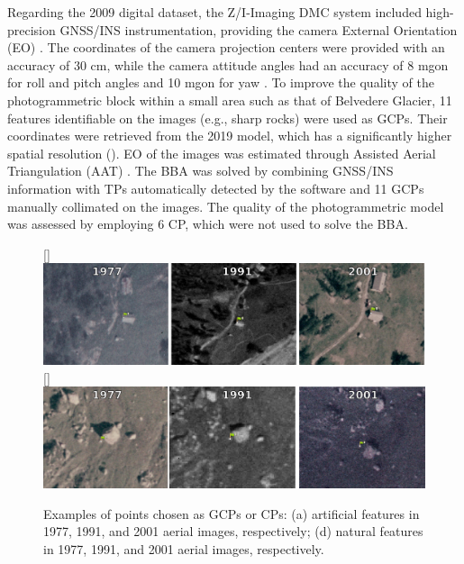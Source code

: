 Regarding the 2009 digital dataset, the Z/I-Imaging DMC system included high-precision GNSS/INS instrumentation, providing the camera External Orientation (EO) \citep{Hinz2001}. 
The coordinates of the camera projection centers were provided with an accuracy of 30 cm, while the camera attitude angles had an accuracy of 8 mgon for roll and pitch angles and 10 mgon for yaw \citep{Forlani_pinto2001}.
To improve the quality of the photogrammetric block within a small area such as that of Belvedere Glacier, 11 features identifiable on the images (e.g., sharp rocks) were used as GCPs. 
Their coordinates were retrieved from the 2019 model, which has a significantly higher spatial resolution (). 
EO of the images was estimated through Assisted Aerial Triangulation (AAT) \citep{ioli2021_lowcost_dgps}. 
The BBA was solved by combining GNSS/INS information with TPs automatically detected by the software and 11 GCPs manually collimated on the images. 
The quality of the photogrammetric model was assessed by employing 6 CP, which were not used to solve the BBA. 

\begin{figure} [ht]
    \centering
    \subcaptionbox{\label{fig:2:gcp_examples:artificial}}[\textwidth]{
        \includegraphics[width=\textwidth]{artificial_gcps}
    } \\
    \subcaptionbox{\label{fig:2:gcp_examples:natural}}[\textwidth]{
        \includegraphics[width=\textwidth]{natural_gcps}
    }
    \caption{Examples of points chosen as GCPs or CPs: (a) artificial features in 1977, 1991, and 2001 aerial images, respectively; (d) natural features in 1977, 1991, and 2001 aerial images, respectively.}
    \label{fig:2:gcp_examples}
\end{figure}

